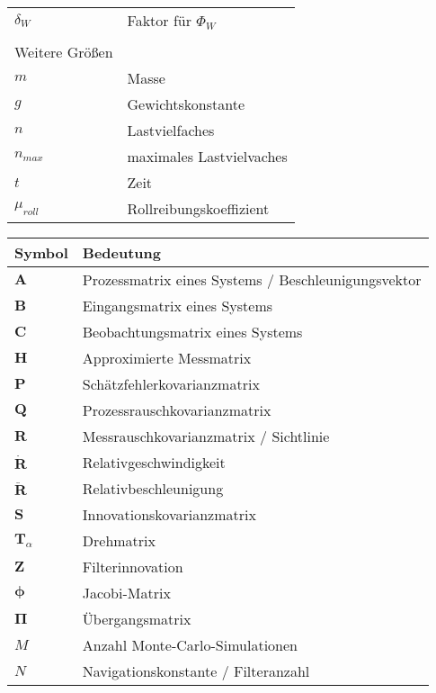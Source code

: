 \begin{table}[H]
\begin{tabular}{ll}
		$\delta_W$			& Faktor für $\Phi_W$\\
		\\
		Weitere Größen\\
		\hline
		$m$					& Masse\\
		$g$					& Gewichtskonstante\\
		$n$					& Lastvielfaches\\
		$n_{max}$			& maximales Lastvielvaches\\
		$t$					& Zeit\\
		$\mu_{roll}$		& Rollreibungskoeffizient\\
	\end{tabular}
\end{table}




\begin{table}[H]
	\begin{tabular}{ll}
		\hline
		Symbol\phantom{123456789}& Bedeutung \phantom{123456789123456789123456789123456789}\\ 
		\hline
		$\boldsymbol{A}$	& Prozessmatrix eines Systems / Beschleunigungsvektor\\
		$\boldsymbol{B}$	& Eingangsmatrix eines Systems\\
		$\boldsymbol{C}$	& Beobachtungsmatrix eines Systems\\
		$\boldsymbol{H}$	& Approximierte Messmatrix\\
		$\boldsymbol{P}$	& Schätzfehlerkovarianzmatrix\\
		$\boldsymbol{Q}$	& Prozessrauschkovarianzmatrix\\
		$\boldsymbol{R}$	& Messrauschkovarianzmatrix / Sichtlinie\\
		$\dot{\boldsymbol{R}}$	& Relativgeschwindigkeit\\
		$\ddot{\boldsymbol{R}}$	& Relativbeschleunigung\\
		$\boldsymbol{S}$	& Innovationskovarianzmatrix\\
		$\boldsymbol{T}_{\alpha}$	& Drehmatrix\\
		$\boldsymbol{Z}$	& Filterinnovation\\
		$\boldsymbol{\phi}$	& Jacobi-Matrix\\
		$\boldsymbol{\Pi}$	& Übergangsmatrix\\
		$M$					& Anzahl Monte-Carlo-Simulationen\\
		$N$					& Navigationskonstante / Filteranzahl\\
	\end{tabular}
\end{table}

